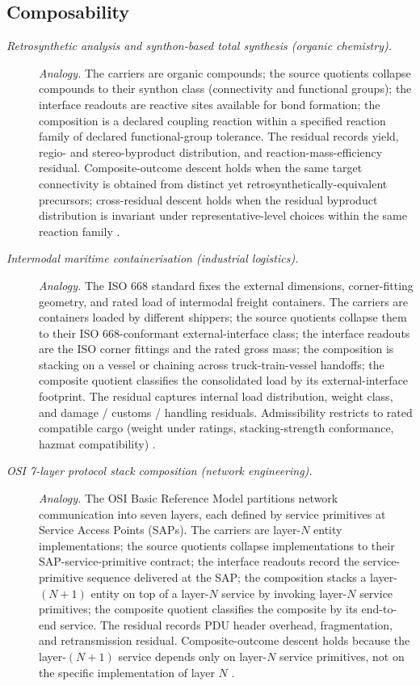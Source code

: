 \subsection*{ Composability}
\begingroup\small
\begin{description}
\item[\emph{Retrosynthetic analysis and synthon-based
total synthesis (organic chemistry).}] \textit{Analogy.}
The carriers are organic compounds; the source quotients
collapse compounds to their synthon class (connectivity
and functional groups); the interface readouts are
reactive sites available for bond formation; the
composition is a declared coupling reaction within a
specified reaction family of declared functional-group
tolerance.  The residual records yield, regio- and
stereo-byproduct distribution, and
reaction-mass-efficiency residual.  Composite-outcome
descent holds
when the same target connectivity is obtained from
distinct yet retrosynthetically-equivalent precursors;
cross-residual descent holds when the residual
byproduct distribution is invariant under
representative-level choices within the same reaction
family \citep{Corey1989LogicSynthesis}.

\item[\emph{Intermodal maritime containerisation
(industrial logistics).}] \textit{Analogy.}
The ISO 668 standard fixes the external dimensions,
corner-fitting geometry, and rated load of intermodal
freight containers.  The carriers are containers loaded
by different shippers; the source quotients collapse
them to their ISO 668-conformant external-interface
class; the interface readouts are the ISO corner
fittings and the rated gross mass; the composition is
stacking on a vessel or chaining across
truck-train-vessel handoffs; the composite quotient
classifies the consolidated load by its
external-interface footprint.  The residual captures
internal load distribution, weight class, and
damage / customs / handling residuals.  Admissibility
restricts to rated compatible cargo (weight under
ratings, stacking-strength conformance, hazmat
compatibility) \citep{ISO668_2020}.

\item[\emph{{OSI} 7-layer protocol stack composition
(network engineering).}] \textit{Analogy.}
The OSI Basic Reference Model partitions network
communication into seven layers, each defined by
service primitives at Service Access Points (SAPs).
The carriers are layer-\(N\) entity implementations;
the source quotients collapse implementations to their
SAP-service-primitive contract; the interface readouts
record the service-primitive sequence delivered at the
SAP; the composition stacks a layer-\((N{+}1)\) entity
on top of a layer-\(N\) service by invoking layer-\(N\)
service primitives; the composite quotient classifies
the composite by its end-to-end service.  The residual
records PDU header overhead, fragmentation, and
retransmission residual.  Composite-outcome descent
holds because the layer-\((N{+}1)\) service depends
only on layer-\(N\) service primitives, not on the
specific implementation of layer \(N\)
\citep{ISOIEC7498OSI}.


\end{description}
